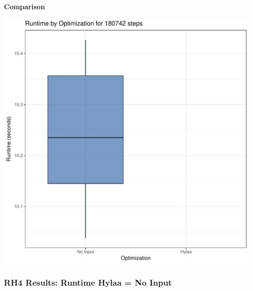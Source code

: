 \documentclass{article}\usepackage[]{graphicx}\usepackage[]{color}
\makeatletter
\def\maxwidth{ %
  \ifdim\Gin@nat@width>\linewidth
    \linewidth
  \else
    \Gin@nat@width
  \fi
}
\newenvironment{knitrout}{}{} %
\makeatother
\begin{document}
 \textbf{Comparison}
  
\begin{knitrout}
\color{fgcolor}
\includegraphics[width=\maxwidth]{figure/RH4_steps180742-1} 

\end{knitrout}


 

	
	\subsubsection{RH4 Results: Runtime Hylaa = No Input}
	
\end{document}
